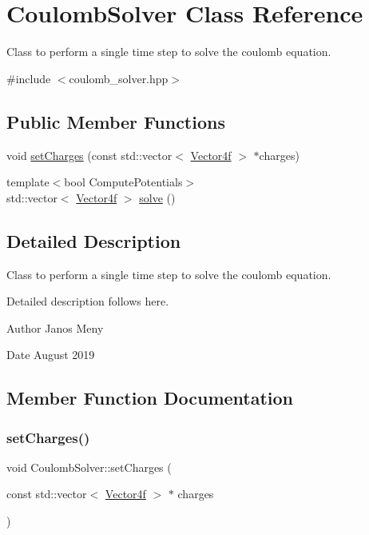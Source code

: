 \hypertarget{classCoulombSolver}{}\section{Coulomb\+Solver Class Reference}
\label{classCoulombSolver}


Class to perform a single time step to solve the coulomb equation.  




{\ttfamily \#include $<$coulomb\+\_\+solver.\+hpp$>$}

\subsection*{Public Member Functions}
\begin{DoxyCompactItemize}
\item 
void \hyperlink{classCoulombSolver_ad336b4a87ab865aa75dd86860862aa81}{set\+Charges} (const std\+::vector$<$ \hyperlink{structVector}{Vector4f} $>$ $\ast$charges)
\item 
{\footnotesize template$<$bool Compute\+Potentials$>$ }\\std\+::vector$<$ \hyperlink{structVector}{Vector4f} $>$ \hyperlink{classCoulombSolver_a5a0cbb3931a1b1939673b9ee918a4300}{solve} ()
\end{DoxyCompactItemize}


\subsection{Detailed Description}
Class to perform a single time step to solve the coulomb equation. 

Detailed description follows here. \begin{DoxyAuthor}{Author}
Janos Meny 
\end{DoxyAuthor}
\begin{DoxyDate}{Date}
August 2019 
\end{DoxyDate}


\subsection{Member Function Documentation}
\mbox{\label{classCoulombSolver_ad336b4a87ab865aa75dd86860862aa81}} 
\subsubsection{\texorpdfstring{set\+Charges()}{setCharges()}}
{\footnotesize\ttfamily void Coulomb\+Solver\+::set\+Charges (\begin{DoxyParamCaption}\item[{const std\+::vector$<$ \hyperlink{structVector}{Vector4f} $>$ $\ast$}]{charges }\end{DoxyParamCaption})}

